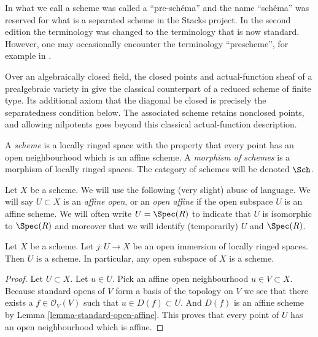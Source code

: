 \begin{definition}
\label{definition-scheme}
\begin{reference}
\cite[Chapter II, \S 1, no. 34, pp. 226--228]{FAC}
\end{reference}
\begin{history}
In \cite{EGA1} what we call a scheme was called a ``pre-sch\'ema'' and the
name ``sch\'ema'' was reserved for what is a separated scheme in the
Stacks project. In the second edition \cite{EGA1-second} the terminology
was changed to the terminology that is now standard. However, one may
occasionally encounter the terminology ``prescheme'', for example in
\cite{Murre-lectures}.

Over an algebraically closed field, the closed points and actual-function
sheaf of a prealgebraic variety in \cite{FAC} give the classical counterpart
of a reduced scheme of finite type. Its additional axiom that the diagonal
be closed is precisely the separatedness condition below. The associated
scheme retains nonclosed points, and allowing nilpotents goes beyond this
classical actual-function description.
\end{history}
A {\it scheme} is a locally ringed space with the property that
every point has an open neighbourhood which is an affine scheme.
A {\it morphism of schemes} is a morphism of locally
ringed spaces. The category of schemes will be denoted
$\Sch$.
\end{definition}

\noindent
Let $X$ be a scheme.
We will use the following (very slight) abuse of language.
We will say $U \subset X$ is an {\it affine open}, or an {\it open affine}
if the open subspace $U$ is an affine scheme. We will often
write $U = \Spec(R)$ to indicate that $U$ is isomorphic
to $\Spec(R)$ and moreover that we will identify (temporarily)
$U$ and $\Spec(R)$.

\begin{lemma}
\label{lemma-open-subspace-scheme}
Let $X$ be a scheme. Let $j : U \to X$ be an open immersion
of locally ringed spaces. Then $U$ is a scheme. In particular,
any open subspace of $X$ is a scheme.
\end{lemma}

\begin{proof}
Let $U \subset X$. Let $u \in U$.
Pick an affine open neighbourhood $u \in V \subset X$.
Because standard opens of $V$ form a basis of the topology
on $V$ we see that there exists a $f\in \mathcal{O}_V(V)$
such that $u \in D(f) \subset U$. And $D(f)$ is an affine scheme
by Lemma \ref{lemma-standard-open-affine}. This proves that every point
of $U$ has an open neighbourhood which is affine.
\end{proof}

